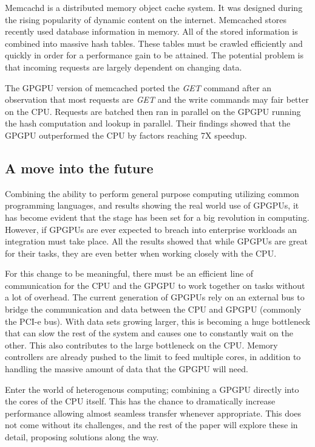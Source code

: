 Memcachd is a distributed memory object cache system. It was designed during the rising popularity of dynamic content on the internet. Memcached stores recently used database information in memory. All of the stored information is combined into massive hash tables. These tables must be crawled efficiently and quickly in order for a performance gain to be attained. The potential problem is that incoming requests are largely dependent on changing data. 

The GPGPU version of memcached ported the \textit{GET} command after an observation that most requests are \textit{GET} and the write commands may fair better on the CPU. Requests are batched then ran in parallel on the GPGPU running the hash computation and lookup in parallel. Their findings showed that the GPGPU outperformed the CPU by factors reaching 7X speedup. \cite{memcached}


\subsection*{A move into the future}

Combining the ability to perform general purpose computing utilizing common programming languages, and results showing the real world use of GPGPUs, it has become evident that the stage has been set for a big revolution in computing. However, if GPGPUs are ever expected to breach into enterprise workloads an integration must take place. All the results showed that while GPGPUs are great for their tasks, they are even better when working closely with the CPU. 

For this change to be meaningful, there must be an efficient line of communication for the CPU and the GPGPU to work together on tasks without a lot of overhead. The current generation of GPGPUs rely on an external bus to bridge the communication and data between the CPU and GPGPU (commonly the PCI-e bus). With data sets growing larger, this is becoming a huge bottleneck that can slow the rest of the system and causes one to constantly wait on the other. This also contributes to the large bottleneck on the CPU. Memory controllers are already pushed to the limit to feed multiple cores, in addition to handling the massive amount of data that the GPGPU will need.

Enter the world of heterogenous computing; combining a GPGPU directly into the cores of the CPU itself. This has the chance to dramatically increase performance allowing almost seamless transfer whenever appropriate. This does not come without its challenges, and the rest of the paper will explore these in detail, proposing solutions along the way. 












